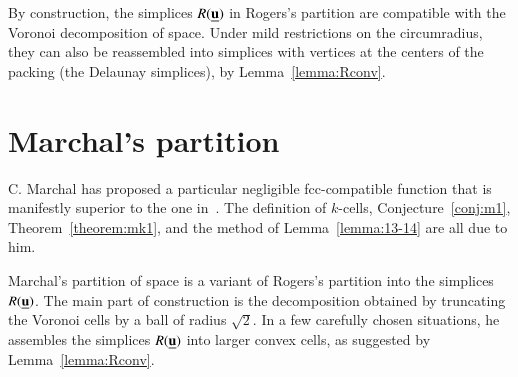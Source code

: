By construction, the simplices $R({\underline{{\mathbf u}}})$ in Rogers's partition  are compatible with the Voronoi
decomposition of space.  Under
mild restrictions on the circumradius, they can also be reassembled into simplices
with vertices at the centers of the packing (the Delaunay simplices),  by Lemma~\ref{lemma:Rconv}.
%
%

\section{Marchal's partition}

C. Marchal has proposed a particular negligible fcc-compatible function that is manifestly superior to the one in~\cite{Hales:2006:DCG}.  The definition of $k$-cells, Conjecture~\ref{conj:m1}, Theorem~\ref{theorem:mk1}, and the method of Lemma~\ref{lemma:13-14} are all due to him.
%


Marchal's partition of space is a variant of Rogers's partition into the simplices $R({\underline{{\mathbf u}}})$.  The main part of construction is  the decomposition obtained by truncating the Voronoi cells by a ball of radius $\sqrt2$.  In a few carefully chosen situations, he assembles the simplices $R({\underline{{\mathbf u}}})$ into larger convex cells, as suggested by Lemma~\ref{lemma:Rconv}.



